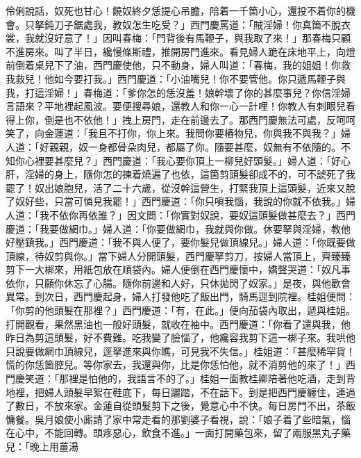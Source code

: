 \begin{showcontents}{}
伶俐說話，奴死也甘心！饒奴終夕恁提心吊膽，陪着一千箇小心，還投不着你的機會。只拏鈍刀子鋸處我，教奴怎生吃受？」西門慶罵道：「賊淫婦！你真箇不脫衣裳，我就沒好意了！」因叫春梅：「門背後有馬鞭子，與我取了來！」那春梅只顧不進房來。叫了半日，纔慢條斯禮，推開房門進來。看見婦人跪在床地平上，向燈前倒着桌兒下了油，西門慶使他，只不動身，婦人叫道：「春梅，我的姐姐！你救我救兒！他如今要打我。」西門慶道：「小油嘴兒！你不要管他。你只遞馬鞭子與我，打這淫婦！」春梅道：「爹你怎的恁沒羞！娘幹壞了你的甚麼事兒？你信淫婦言語來？平地裡起風波。要便搜尋娘，還教人和你一心一計哩！你教人有刺眼兒看得上你，倒是也不依他！」拽上房門，走在前邊去了。那西門慶無法可處，反呵呵笑了，向金蓮道：「我且不打你，你上來。我問你要樁物兒，你與我不與我？」婦人道：「好親親，奴一身都骨朵肉兒，都屬了你。隨要甚麼，奴無有不依隨的。不知你心裡要甚麼兒？」西門慶道：「我心要你頂上一柳兒好頭髮。」婦人道：「好心肝，淫婦的身上，隨你怎的揀着燒遍了也依，這箇剪頭髮卻成不的，可不諕死了我罷了！奴出娘胞兒，活了二十六歲，從沒幹這營生，打緊我頂上這頭髮，近來又脫了奴好些，只當可憐見我罷！」西門慶道：「你只嗔我惱，我說的你就不依我。」婦人道：「我不依你再依誰？」因文問：「你實對奴說，要奴這頭髮做甚麼去？」西門慶道：「我要做網巾。」婦人道：「你要做網巾，我就與你做。休要拏與淫婦，教他好壓鎮我。」西門慶道：「我不與人便了，要你髮兒做頂線兒。」婦人道：「你既要做頂線，待奴剪與你。」當下婦人分開頭髮，西門慶拏剪刀，按婦人當頂上，齊臻臻剪下一大梆來，用紙包放在順袋內。婦人便倒在西門慶懷中，嬌聲哭道：「奴凡事依你，只願你休忘了心腸。隨你前邊和人好，只休拋閃了奴家。」是夜，與他歡會異常。到次日，西門慶起身，婦人打發他吃了飯出門，騎馬逕到院裡。桂姐便問：「你剪的他頭髮在那裡？」西門慶道：「有，在此。」便向茄袋內取出，遞與桂姐。打開觀看，果然黑油也一般好頭髮，就收在袖中。西門慶道：「你看了還與我，他昨日為剪這頭髮，好不費難。吃我變了臉惱了，他纔容我剪下這一梆子來。我哄他只說要做網巾頂線兒，逕拏進來與你瞧，可見我不失信。」桂姐道：「甚麼稀罕貨！慌的你恁箇腔兒。等你家去，我還與你，比是你恁怕他，就不消剪他的來了！」西門慶笑道：「那裡是怕他的，我語言不的了。」桂姐一面教桂卿陪著他吃酒，走到背地裡，把婦人頭髮早絮在鞋底下，每日躧踏，不在話下。到是把西門慶纏住，連過了數日，不放來家。金蓮自從頭髮剪下之後，覺意心中不快。每日房門不出，茶飯慵餐。吳月娘使小廝請了家中常走看的那劉婆子看視，說：「娘子着了些暗氣，惱在心中，不能回轉。頭疼惡心，飲食不進。」一面打開藥包來，留了兩服黑丸子藥兒：「晚上用薑湯 
\end{showcontents}

